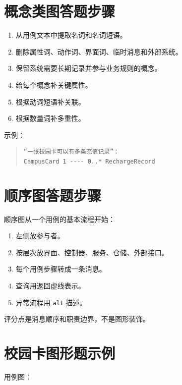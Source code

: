 \documentclass[UTF8,zihao=-4]{ctexart}
\begin{document}
\section{概念类图答题步骤}

\begin{enumerate}
\item 从用例文本中提取名词和名词短语。
\item 删除属性词、动作词、界面词、临时消息和外部系统。
\item 保留系统需要长期记录并参与业务规则的概念。
\item 给每个概念补关键属性。
\item 根据动词短语补关联。
\item 根据数量词补多重性。
\end{enumerate}

示例：

\begin{quote}
\footnotesize
\begin{verbatim}
“一张校园卡可以有多条充值记录”：
CampusCard 1 ---- 0..* RechargeRecord
\end{verbatim}
\end{quote}

\section{顺序图答题步骤}

顺序图从一个用例的基本流程开始：

\begin{enumerate}
\item 左侧放参与者。
\item 按层次放界面、控制器、服务、仓储、外部接口。
\item 每个用例步骤转成一条消息。
\item 查询用返回虚线表示。
\item 异常流程用 \texttt{alt} 描述。
\end{enumerate}

评分点是消息顺序和职责边界，不是图形装饰。

\section{校园卡图形题示例}

用例图：
\end{document}
